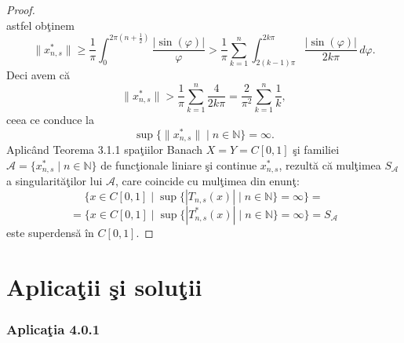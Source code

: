 \documentclass[a4paper,openany,12pt]{report}
\begin{document}
\begin{proof}
\begin{equation*}
\end{equation*}
astfel ob\c tinem
\begin{equation*}
\|x_{n,s}^*\| \geq \frac{1}{\pi} \int_0^{2\pi(n+\frac{1}{2})}\frac{\left| \sin(\varphi)\right|}{\varphi}> \frac{1}{\pi}\sum_{k=1}^{n}\int_{2(k-1)\pi}^{2k\pi}\frac{\left| \sin(\varphi)\right|}{2k\pi}\, d\varphi.
\end{equation*}
Deci avem c\u a
\begin{equation*}
\|x_{n,s}^*\|> \frac{1}{\pi}\sum_{k=1}^n \frac{4}{2k\pi}=\frac{2}{\pi^2}\sum_{k=1}^n \frac{1}{k},
\end{equation*}
ceea ce conduce la 
\begin{equation*}
\sup\Big\{\|x_{n,s}^*\| \mid n \in \mathbb{N}\Big\} = \infty.
\end{equation*}
Aplic\^ and Teorema 3.1.1 spa\c tiilor Banach $X=Y=C[0,1]$ \c si familiei $\mathcal{A}=\{x_{n,s}^* \mid n \in \mathbb{N}\}$ de func\c tionale liniare \c si continue $x_{n,s}^*$, rezult\u a c\u a mul\c timea $S_{\mathcal{A}}$ a singularit\u a\c tilor lui $\mathcal{A}$, care coincide cu mul\c timea din enun\c t:
\newline
\newline
\begin{equation*}
\Big\{ x \in C[0,1] \mid \sup\{\left| T_{n,s}(x)\right| \mid n \in \mathbb{N}\}=\infty\Big\}=
\end{equation*}
\begin{equation*}
=\Big\{ x \in C[0,1] \mid \sup\{\left| T_{n,s}^*(x)\right| \mid n \in \mathbb{N}\}=\infty\Big\}=S_{\mathcal{A}}
\end{equation*}
este superdens\u a \^ in $C[0,1]$.
\end{proof}




\chapter{Aplica\c tii \c si solu\c tii}
\subsection*{Aplica\c tia 4.0.1}
\end{document}
